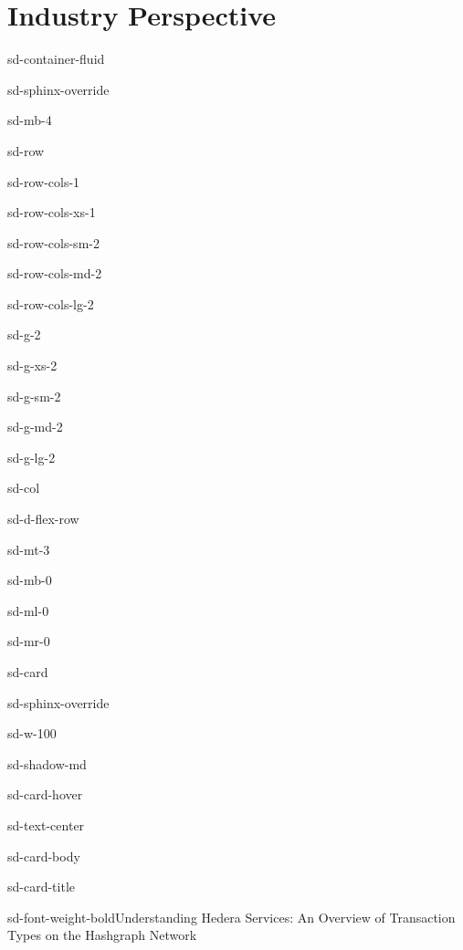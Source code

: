 \documentclass[letterpaper,10pt,english]{jupyterBook}
\begin{document}
\chapter{Industry Perspective}
\label{\detokenize{STRUCTURE/industry_2:industry-perspective}}\label{\detokenize{STRUCTURE/industry_2::doc}}
\begin{sphinxuseclass}{sd-container-fluid}
\begin{sphinxuseclass}{sd-sphinx-override}
\begin{sphinxuseclass}{sd-mb-4}
\begin{sphinxuseclass}{sd-row}
\begin{sphinxuseclass}{sd-row-cols-1}
\begin{sphinxuseclass}{sd-row-cols-xs-1}
\begin{sphinxuseclass}{sd-row-cols-sm-2}
\begin{sphinxuseclass}{sd-row-cols-md-2}
\begin{sphinxuseclass}{sd-row-cols-lg-2}
\begin{sphinxuseclass}{sd-g-2}
\begin{sphinxuseclass}{sd-g-xs-2}
\begin{sphinxuseclass}{sd-g-sm-2}
\begin{sphinxuseclass}{sd-g-md-2}
\begin{sphinxuseclass}{sd-g-lg-2}
\begin{sphinxuseclass}{sd-col}
\begin{sphinxuseclass}{sd-d-flex-row}
\begin{sphinxuseclass}{sd-mt-3}
\begin{sphinxuseclass}{sd-mb-0}
\begin{sphinxuseclass}{sd-ml-0}
\begin{sphinxuseclass}{sd-mr-0}
\begin{sphinxuseclass}{sd-card}
\begin{sphinxuseclass}{sd-sphinx-override}
\begin{sphinxuseclass}{sd-w-100}
\begin{sphinxuseclass}{sd-shadow-md}
\begin{sphinxuseclass}{sd-card-hover}
\begin{sphinxuseclass}{sd-text-center}
\begin{sphinxuseclass}{sd-card-body}
\begin{sphinxuseclass}{sd-card-title}
\begin{sphinxuseclass}{sd-font-weight-bold}Understanding Hedera Services: An Overview of Transaction Types on the Hashgraph Network
\end{sphinxuseclass}
\end{sphinxuseclass}



\end{sphinxuseclass}
\end{sphinxuseclass}
\end{sphinxuseclass}
\end{sphinxuseclass}
\end{sphinxuseclass}
\end{sphinxuseclass}
\end{sphinxuseclass}
\end{sphinxuseclass}
\end{sphinxuseclass}
\end{sphinxuseclass}
\end{sphinxuseclass}
\end{sphinxuseclass}
\end{sphinxuseclass}
\end{sphinxuseclass}
\end{sphinxuseclass}
\end{sphinxuseclass}
\end{sphinxuseclass}
\end{sphinxuseclass}
\end{sphinxuseclass}
\end{sphinxuseclass}
\end{sphinxuseclass}
\end{sphinxuseclass}
\end{sphinxuseclass}
\end{sphinxuseclass}
\end{sphinxuseclass}
\end{sphinxuseclass}
\end{sphinxuseclass}
\end{document}

